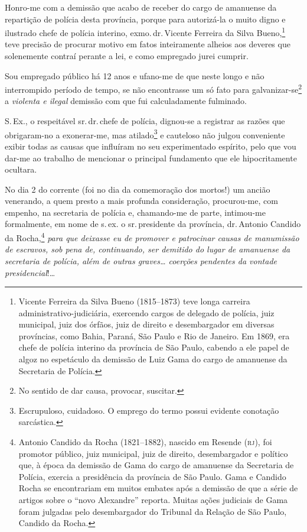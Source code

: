 Honro-me com a demissão que acabo de receber do cargo de amanuense da
repartição de polícia desta província, porque para autorizá-la o muito
digno e ilustrado chefe de polícia interino, exmo.\,dr.\,Vicente Ferreira
da Silva Bueno,\footnote{Vicente Ferreira da Silva Bueno (1815--1873)\label{bueno}
  teve longa carreira administrativo-judiciária, exercendo cargos de
  delegado de polícia, juiz municipal, juiz dos órfãos, juiz de direito
  e desembargador em diversas províncias, como Bahia, Paraná, São Paulo
  e Rio de Janeiro. Em 1869, era chefe de polícia interino da província
  de São Paulo, cabendo a ele papel de algoz no espetáculo da demissão
  de Luiz Gama do cargo de amanuense da Secretaria de Polícia.} teve
precisão de procurar motivo em fatos inteiramente alheios aos deveres
que solenemente contraí perante a lei, e como empregado jurei cumprir.

Sou empregado público há 12 anos e ufano-me de que neste longo e não
interrompido período de tempo, se não encontrasse um só fato para
galvanizar-se\footnote{No sentido de dar causa, provocar, suscitar.} a
\emph{violenta e ilegal} demissão com que fui calculadamente fulminado.

S.\,Ex., o respeitável sr.\,dr.\,chefe de polícia, dignou-se a registrar as
razões que obrigaram-no a exonerar-me, mas atilado\footnote{
  Escrupuloso, cuidadoso. O emprego do termo possui evidente conotação
  sarcástica.} e cauteloso não julgou conveniente exibir todas as causas
que influíram no seu experimentado espírito, pelo que vou dar-me ao
trabalho de mencionar o principal fundamento que ele hipocritamente
ocultara.

No dia 2 do corrente (foi no dia da comemoração dos mortos!) um ancião
venerando, a quem presto a mais profunda consideração, procurou-me, com
empenho, na secretaria de polícia e, chamando-me de parte, intimou-me
formalmente, em nome de s.\,ex. o sr.\,presidente da província, dr.\,Antonio Candido da Rocha,\footnote{Antonio Candido da Rocha
  (1821--1882), nascido em Resende (\textsc{rj}), foi promotor público, juiz
  municipal, juiz de direito, desembargador e político que, à época da
  demissão de Gama do cargo de amanuense da Secretaria de Polícia,
  exercia a presidência da província de São Paulo. Gama e Candido Rocha
  se encontrariam em muitos embates após a demissão de que a série de
  artigos sobre o ``novo Alexandre'' reporta. Muitas ações judiciais de
  Gama foram julgadas pelo desembargador do Tribunal da Relação de São
  Paulo, Candido da Rocha.} \emph{para que deixasse eu de promover e
patrocinar causas de manumissão de escravos, sob pena de, continuando,
ser demitido do lugar de amanuense da secretaria de polícia, além de
outras graves\ldots{} coerções pendentes da vontade presidencial}!\ldots{}

